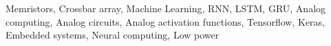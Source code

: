 \begin{keywords}
  Memristors, Crossbar array, Machine Learning, RNN, LSTM, GRU, Analog computing, Analog circuits, Analog activation functions, Tensorflow, Keras, Embedded systems, Neural computing, Low power
\end{keywords}
\clearpage
\thispagestyle{empty}
\cleardoublepage
